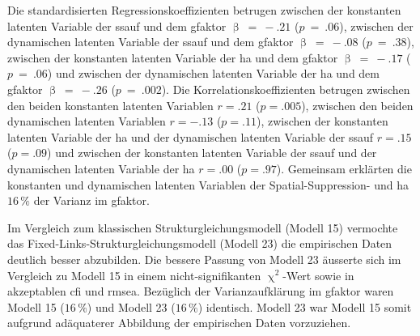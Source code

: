\documentclass[11pt, twoside, a4paper]{book}		%
\begin{document}
Die standardisierten Regressionskoeffizienten betrugen zwischen der konstanten latenten Variable der \gls{ssauf} und dem \gls{gfaktor} $\upbeta~=~-.21$ ($p~=~.06$), zwischen der dynamischen latenten Variable der \gls{ssauf} und dem \gls{gfaktor} $\upbeta~=~-.08$ ($p~=~.38$), zwischen der konstanten latenten Variable der \gls{ha} und dem \gls{gfaktor} $\upbeta~=~-.17$ ($p~=~.06$) und zwischen der dynamischen latenten Variable der \gls{ha} und dem \gls{gfaktor} $\upbeta~=~-.26$ ($p~=~.002$). Die Korrelationskoeffizienten betrugen zwischen den beiden konstanten latenten Variablen $r=.21$ ($p=.005$), zwischen den beiden dynamischen latenten Variablen $r=-.13$ ($p=.11$), zwischen der konstanten latenten Variable der \gls{ha} und der dynamischen latenten Variable der \gls{ssauf} $r=.15$ ($p=.09$) und zwischen der konstanten latenten Variable der \gls{ssauf} und der dynamischen latenten Variable der \gls{ha} $r=.00$ ($p=.97$). Gemeinsam erklärten die konstanten und dynamischen latenten Variablen der Spatial-Suppression- und \gls{ha} $16\,\%$ der Varianz im \gls{gfaktor}. 

Im Vergleich zum klassischen Strukturgleichungsmodell (Modell 15) vermochte das Fixed-Links-Struk\-tur\-glei\-chungs\-mo\-dell (Modell 23) die empirischen Daten deutlich besser abzubilden. Die bessere Passung von Modell 23 äusserte sich im Vergleich zu Modell 15 in einem nicht-signifikanten $\upchi^2$-Wert sowie in akzeptablen \gls{cfi} und \gls{rmsea}. Bezüglich der Varianzaufklärung im \gls{gfaktor} waren Modell 15 ($16\,\%$) und Modell 23 ($16\,\%$) identisch. Modell 23 war Modell 15 somit aufgrund adäquaterer Abbildung der empirischen Daten vorzuziehen.
\end{document}
